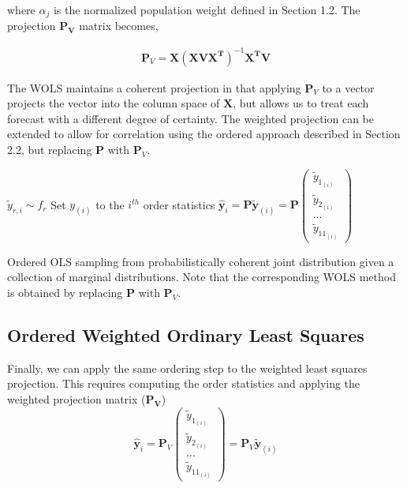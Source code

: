 \documentclass{umassthesis}          %
\begin{document}
where $\alpha_j$ is the normalized population weight defined in Section 1.2. The projection $\bm{P_{V}}$ matrix becomes,

\begin{align}
\bm{P}_V= \bm{X}(\bm{X}\bm{V}\bm{X^T})^{-1}\bm{X^T}\bm{V}
\end{align} 

The WOLS maintains a coherent projection in that applying $\bm{P}_V$ to a vector projects the vector into the column space of $\bm{X}$, but allows us to treat each forecast with a different degree of certainty. The weighted projection can be extended to allow for correlation using the ordered approach described in Section 2.2, but replacing $\bm{P}$ with $\bm{P}_V$. 





\begin{center}
\begin{algorithm}
    \begin{algorithmic}[1]
\State $\tilde{y}_{r,i} \sim f_r$
\EndFor
\EndFor
{}
\State Set $y_{(i)} $ to the $i^{th}$ order statistics 
\State $\hat{\bm{y}}_{i} = \bm{P}\tilde{\bm{y}}_{(i)} = \bm{P} \begin{pmatrix} \tilde{y}_{1_{(i)}} \\ \tilde{y}_{2_{(i)}} \\ ... \\ \tilde{y}_{11_{(i)}}  \end{pmatrix}$
\EndFor

    \end{algorithmic}
    \label{alg:rAP}
    \caption{ Ordered OLS sampling from probabilistically coherent joint distribution given a collection of marginal distributions. Note that the corresponding WOLS method is obtained by replacing $\bm{P}$ with $\bm{P}_V$.}
\end{algorithm}
\end{center}



\subsection{Ordered Weighted Ordinary Least Squares}

Finally, we can apply the same ordering step to the weighted least squares projection. This requires computing the order statistics and applying the weighted projection matrix ($\bm{P_V}$)
$$\bm{\hat{y}}_{i}=\bm{P}_V \begin{pmatrix} \tilde{y}_{1_{(i)}} \\  \tilde{y}_{2_{(i)}} \\ ... \\  \tilde{y}_{11_{(i)}} \end{pmatrix} = \bm{P}_V \bm{\tilde{y}}_{(i)}$$
\end{document}
